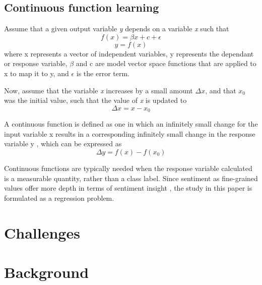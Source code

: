 \documentclass[conference]{IEEEtran}
\begin{document}
\subsection{Continuous function learning}
Assume that a given output variable \textit{y} depends on a variable \textit{x} such that
\begin{equation}
\displaystyle f(x) = \beta x + c + \epsilon
\end{equation}
\begin{equation}
\displaystyle y = f(x)
\end{equation}
where x represents a vector of independent variables, y represents the dependant or response variable, $\beta$ and c are model vector space functions that are applied to x to map it to y, and $\epsilon$ is the error term.

Now, assume that the variable \textit{x} increases by a small amount $\Delta x$, and that $x_0$ was the initial value, such that the value of \textit{x} is updated to
\begin{equation}
\displaystyle \Delta x = x - x_0
\end{equation}

A continuous function is defined as one in which an infinitely small change for the input variable x results in a corresponding infinitely small change in the response variable y \cite{continuous_function}, which can be expressed as
\begin{equation}
\displaystyle \Delta y = f(x) - f(x_0)
\end{equation}

Continuous functions are typically needed when the response variable calculated is a measurable quantity, rather than a class label. Since sentiment as fine-grained values offer more depth in terms of sentiment insight \cite{drake2008sentiment}, the study in this paper is formulated as a regression problem.

\section{Challenges}

\subsection{}


\section{Background}
\end{document}
